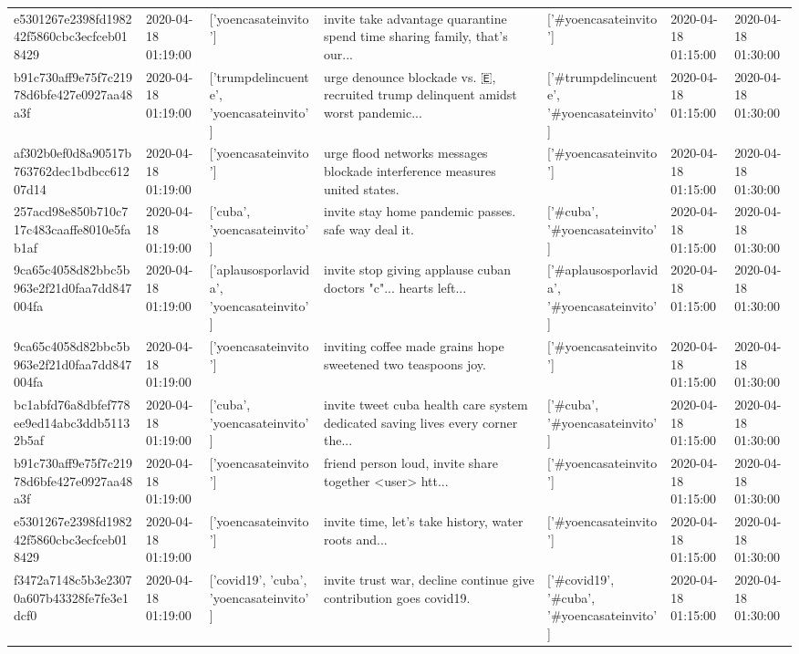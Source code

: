 \begin{tabular}{lllllll}
e5301267e2398fd198242f5860cbc3ecfceb018429 & 2020-04-18 01:19:00 & ['yoencasateinvito'] & invite take advantage quarantine spend time sharing family, that's our... & ['#yoencasateinvito'] & 2020-04-18 01:15:00 & 2020-04-18 01:30:00 \\
b91c730aff9e75f7c21978d6bfe427e0927aa48a3f & 2020-04-18 01:19:00 & ['trumpdelincuente', 'yoencasateinvito'] & urge denounce blockade vs. 🇪, recruited trump delinquent amidst worst pandemic... & ['#trumpdelincuente', '#yoencasateinvito'] & 2020-04-18 01:15:00 & 2020-04-18 01:30:00 \\
af302b0ef0d8a90517b763762dec1bdbcc61207d14 & 2020-04-18 01:19:00 & ['yoencasateinvito'] & urge flood networks messages blockade interference measures united states. & ['#yoencasateinvito'] & 2020-04-18 01:15:00 & 2020-04-18 01:30:00 \\
257acd98e850b710c717c483caaffe8010e5fab1af & 2020-04-18 01:19:00 & ['cuba', 'yoencasateinvito'] & invite stay home pandemic passes. safe way deal it. & ['#cuba', '#yoencasateinvito'] & 2020-04-18 01:15:00 & 2020-04-18 01:30:00 \\
9ca65c4058d82bbc5b963e2f21d0faa7dd847004fa & 2020-04-18 01:19:00 & ['aplausosporlavida', 'yoencasateinvito'] & invite stop giving applause cuban doctors "c"... hearts left... & ['#aplausosporlavida', '#yoencasateinvito'] & 2020-04-18 01:15:00 & 2020-04-18 01:30:00 \\
9ca65c4058d82bbc5b963e2f21d0faa7dd847004fa & 2020-04-18 01:19:00 & ['yoencasateinvito'] & inviting coffee made grains hope sweetened two teaspoons joy. & ['#yoencasateinvito'] & 2020-04-18 01:15:00 & 2020-04-18 01:30:00 \\
bc1abfd76a8dbfef778ee9ed14abc3ddb51132b5af & 2020-04-18 01:19:00 & ['cuba', 'yoencasateinvito'] & invite tweet cuba health care system dedicated saving lives every corner the... & ['#cuba', '#yoencasateinvito'] & 2020-04-18 01:15:00 & 2020-04-18 01:30:00 \\
b91c730aff9e75f7c21978d6bfe427e0927aa48a3f & 2020-04-18 01:19:00 & ['yoencasateinvito'] & friend person loud, invite share together <user> htt... & ['#yoencasateinvito'] & 2020-04-18 01:15:00 & 2020-04-18 01:30:00 \\
e5301267e2398fd198242f5860cbc3ecfceb018429 & 2020-04-18 01:19:00 & ['yoencasateinvito'] & invite time, let's take history, water roots and... & ['#yoencasateinvito'] & 2020-04-18 01:15:00 & 2020-04-18 01:30:00 \\
f3472a7148c5b3e23070a607b43328fe7fe3e1dcf0 & 2020-04-18 01:19:00 & ['covid19', 'cuba', 'yoencasateinvito'] & invite trust war, decline continue give contribution goes covid19. & ['#covid19', '#cuba', '#yoencasateinvito'] & 2020-04-18 01:15:00 & 2020-04-18 01:30:00 \\

\end{tabular}

